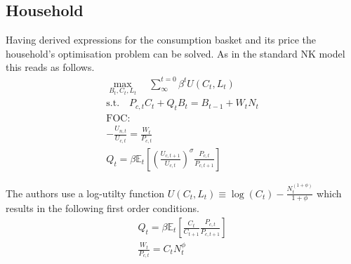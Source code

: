 \documentclass[12pt,a4paper,english]{article} %
\newcommand{\E}{\mathbb{E}} %
\begin{document}
	\subsection{Household}
	Having derived expressions for the consumption basket and its price the household's optimisation problem can be solved. As in the standard NK model this reads as follows. 
	\begin{equation}
		\begin{aligned}
			\max_{B_t, C_t, L_t} \quad \sum_{\infty}^{t=0} \beta^{t} U(C_{t}, L_{t}) \\
			\textrm{s.t.} \quad P_{c,t} C_t + Q_t B_t = B_{t-1} + W_t N_t \\
			\textrm{FOC:} \\
			- \frac{U_{n,t}}{U_{c, t}} = \frac{W_t}{P_{c,t}}\\
			Q_t = \beta \E_t \left[ \left( \frac{U_{c, t+1}}{U_{c,t}} \right)^\sigma \frac{P_{c,t}}{P_{c,t+1}} \right] 			
		\end{aligned}
	\end{equation}
	
	The authors use a log-utilty function $U(C_t,L_t) \equiv \log(C_t) - \frac{N_t^{(1+\phi)}}{1+\phi}$ which results in the following first order conditions.
	\begin{equation}
		\begin{aligned}
			Q_t = \beta \E_t \left[ \frac{C_t}{C_{t+1}} \frac{P_{c,t}}{P_{c,t+1}} \right] \\
			\frac{W_t}{P_{c,t}} = C_t N_t^\phi
		\end{aligned}
	\end{equation}
\end{document}
